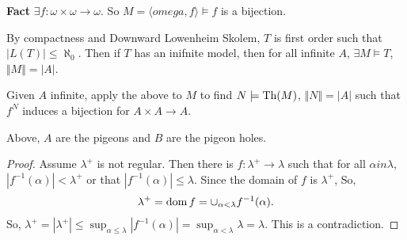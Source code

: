\documentclass{report}
\begin{document}
\noindent \textbf{Fact} $\exists f: \omega \times \omega \to \omega$. So $M = \langle omega, f \rangle \models f$ is a bijection. 

By compactness and Downward Lowenheim Skolem, $T$ is first order such that $|L(T)| \leq \aleph_0$.  Then if $T$ has an inifnite model, then for all infinite $A$, $\exists M \models T$, $\Vert M \Vert = |A|$. 

Given $A$ infinite, apply the above to $M$ to find $N \models \text{Th}(M)$, $\Vert N \Vert = |A|$ such that $f^N$ induces a bijection for $A \times A \to A$. 

Above, $A$ are the pigeons and $B$ are the pigeon holes. 

\newpage 
{}
\begin{proof}
    Assume $\lambda^+$ is not regular. Then there is $f: \lambda^+ \to \lambda$ such that for all $\alpha in \lambda$, $|f^{-1}(\alpha)| <\lambda^+$ or that $|f^{-1}(\alpha)| \leq \lambda$. Since the domain of $f$ is $\lambda^+$, So,
    \begin{align*}
        \lambda^+ = \operatorname{dom} f = \cup_{\alpha < \lambda}f^{-1}(\alpha).
    \end{align*}
    So, $\lambda^+ = |\lambda^+| \leq \sup_{\alpha \leq \lambda} |f^{-1}(\alpha)| = \sup_{\alpha < \lambda}\lambda = \lambda$. This  is a contradiction.
\end{proof}


\end{document}
